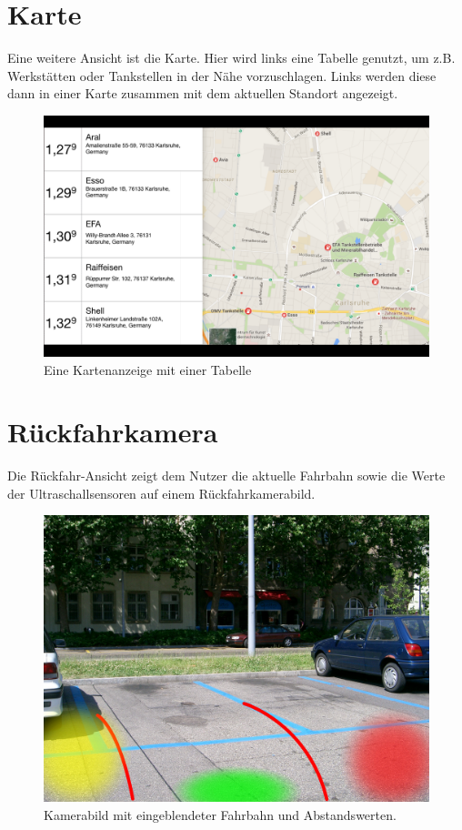 \documentclass[pflichtenheft.tex]{subfiles}
\begin{document}
\clearpage
\section{Karte}
\label{sec:Karte}

Eine weitere Ansicht ist die Karte. Hier wird links eine Tabelle genutzt, um z.B. Werkstätten oder Tankstellen in der Nähe vorzuschlagen. Links werden diese dann in einer Karte zusammen mit dem aktuellen Standort angezeigt.

\begin{figure}[H]
  	\begin{center}
 		\includegraphics[width=\textwidth]{Images/GUI-Map.png}
  		\caption{Eine Kartenanzeige mit einer Tabelle}
  	\end{center}
\end{figure}

\clearpage
\section{Rückfahrkamera}

Die Rückfahr-Ansicht zeigt dem Nutzer die aktuelle Fahrbahn sowie die Werte der Ultraschallsensoren auf einem Rückfahrkamerabild.

\begin{figure}[H]
  	\begin{center}
 		\includegraphics[width=\textwidth]{Images/GUI-BackDrive.jpg}
  		\caption{Kamerabild mit eingeblendeter Fahrbahn und Abstandswerten.}
  	\end{center}
\end{figure}
\end{document}
